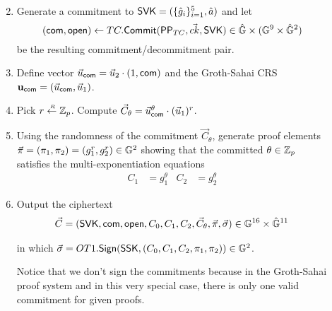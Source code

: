 \begin{description}
\begin{enumerate}
\begin{align*}
    \end{align*}
  \item Generate a commitment to $\mathsf{SVK} = (\{\hat{g}_i\}_{i =1}^5, \hat{a})$ and let 
    $$(\mathsf{com}, \mathsf{open}) \gets TC.{\mathsf{Commit}}(\mathsf{PP}_{TC}, \vec{ck}, \mathsf{SVK}) \in \hat{\mathbb{G}} \times (\mathbb{G}^9 \times \hat{\mathbb{G}}^2)$$
    be the resulting commitment/decommitment pair.
  \item Define vector $\vec{u}_{\mathsf{com}} = \vec{u}_2\cdot (1, \mathsf{com})$ and the Groth-Sahai CRS $\mathbf{u}_{\mathsf{com}}=(\vec{u}_{\mathsf{com}},\vec{u}_1)$. 
  \item Pick $r \stackrel{{\scriptscriptstyle \mkern4mu R}}{\gets} \mathbb{Z}_p$. Compute $\vec{C}_{\theta} = \vec{u}_{\mathsf{com}}^{\theta} \cdot (\vec{u}_1)^r$.
  \item Using the randomness of the commitment $\vec{C}_{\theta}$, generate  proof elements $\vec{\pi}=(\pi_1,\pi_2)=(g_1^r,g_2^r) \in \mathbb{G}^2$ showing that the committed $\theta \in \mathbb{Z}_p$ satisfies the multi-exponentiation equations
    \begin{align*}
      C_1 &= g_1^{\theta} & C_2 &= g_2^{\theta}
    \end{align*}
  \item Output the ciphertext
    \begin{align*}
      \vec{C} = (\mathsf{SVK}, \mathsf{com}, \mathsf{open}, C_0, C_1, C_2, \vec{C}_{\theta}, \vec{\pi}, \vec{\sigma}) \in \mathbb{G}^{16} \times \hat{\mathbb{G}}^{11}
    \end{align*}
    
    
    in which $\vec{\sigma} = OT1.{\mathsf{Sign}}(\mathsf{SSK}, (C_0, C_1, C_2, {\pi}_1,\pi_2)) \in \mathbb{G}^2$.

    Notice that we don't sign the commitments because in the Groth-Sahai proof system and in this very special case, there is only one valid commitment for given proofs.
    
  \end{enumerate}
  

\end{description}
